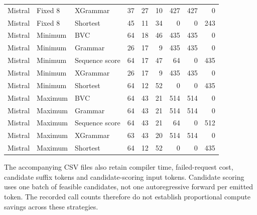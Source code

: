 \documentclass[12pt,a4paper]{article}
\begin{document}
\begin{longtable}{@{}lllrrrrrr@{}}
Mistral & Fixed 8 & XGrammar & 37 & 27 & 10 & 427 & 427 & 0 \\
Mistral & Fixed 8 & Shortest & 45 & 11 & 34 & 0 & 0 & 243 \\
Mistral & Minimum & BVC & 64 & 18 & 46 & 435 & 435 & 0 \\
Mistral & Minimum & Grammar & 26 & 17 & 9 & 435 & 435 & 0 \\
Mistral & Minimum & Sequence score & 64 & 17 & 47 & 64 & 0 & 435 \\
Mistral & Minimum & XGrammar & 26 & 17 & 9 & 435 & 435 & 0 \\
Mistral & Minimum & Shortest & 64 & 12 & 52 & 0 & 0 & 435 \\
Mistral & Maximum & BVC & 64 & 43 & 21 & 514 & 514 & 0 \\
Mistral & Maximum & Grammar & 64 & 43 & 21 & 514 & 514 & 0 \\
Mistral & Maximum & Sequence score & 64 & 43 & 21 & 64 & 0 & 512 \\
Mistral & Maximum & XGrammar & 63 & 43 & 20 & 514 & 514 & 0 \\
Mistral & Maximum & Shortest & 64 & 12 & 52 & 0 & 0 & 435 \\
\bottomrule
\end{longtable}

The accompanying CSV files also retain compiler time, failed-request cost, candidate suffix tokens and candidate-scoring input tokens. Candidate scoring uses one batch of feasible candidates, not one autoregressive forward per emitted token. The recorded call counts therefore do not establish proportional compute savings across these strategies.
\end{document}
